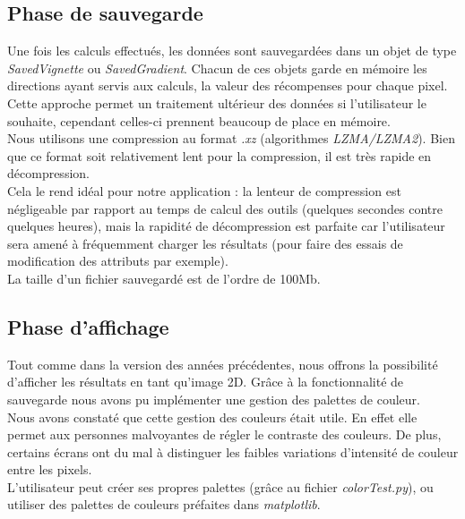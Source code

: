 \documentclass[12pt]{article}
\begin{document}
\subsection{Phase de sauvegarde}

Une fois les calculs effectués, les données sont sauvegardées dans un objet de type \emph{SavedVignette} ou \emph{SavedGradient}. Chacun de ces objets garde en mémoire les directions ayant servis aux calculs, la valeur des récompenses pour chaque pixel. \\

Cette approche permet un traitement ultérieur des données si l'utilisateur le souhaite, cependant celles-ci prennent beaucoup de place en mémoire. \\

Nous utilisons une compression au format \emph{.xz} (algorithmes \emph{LZMA/LZMA2}). Bien que ce format soit relativement lent pour la compression, il est très rapide en décompression. \\

Cela le rend idéal pour notre application : la lenteur de compression est négligeable par rapport au temps de calcul des outils (quelques secondes contre quelques heures), mais la rapidité de décompression est parfaite car l'utilisateur sera amené à fréquemment charger les résultats (pour faire des essais de modification des attributs par exemple). \\

La taille d'un fichier sauvegardé est de l'ordre de 100Mb. \\

\subsection{Phase d'affichage}
\label{sec:affichage}

Tout comme dans la version des années précédentes, nous offrons la possibilité d'afficher les résultats en tant qu'image 2D. Grâce à la fonctionnalité de sauvegarde nous avons pu implémenter une gestion des palettes de couleur. \\

Nous avons constaté que cette gestion des couleurs était utile. En effet elle permet aux personnes malvoyantes de régler le contraste des couleurs. De plus, certains écrans ont du mal à distinguer les faibles variations d'intensité de couleur entre les pixels. \\

L'utilisateur peut créer ses propres palettes (grâce au fichier \emph{colorTest.py}), ou utiliser des palettes de couleurs préfaites dans \emph{matplotlib}. \\
\end{document}
